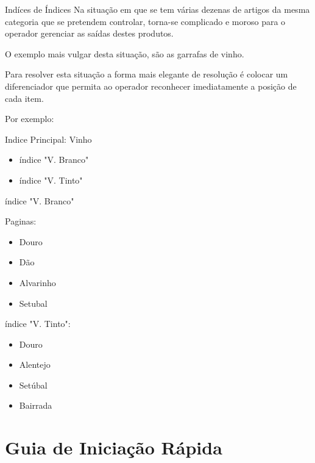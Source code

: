 \documentclass[a4paper,11pt,openany]{memoir}
\begin{document}
\begin{bclogo}[couleur=blue!10,arrondi=0.1,logo=\bccrayon,ombre=true]{Indíces de Índices}
Na situação em que se tem várias dezenas de artigos da mesma categoria que se pretendem controlar,
torna-se complicado e moroso para o operador gerenciar as saídas destes produtos.

O exemplo mais vulgar desta situação, são as garrafas de vinho. 

Para resolver esta situação a forma mais elegante de resolução é colocar um diferenciador que permita 
ao operador reconhecer imediatamente a posição de cada item.

Por exemplo:

Indice Principal: Vinho
\begin{itemize}
\item índice "V. Branco" 
\item índice "V. Tinto"
\end{itemize}

índice "V. Branco"

Paginas:

\begin{itemize}
\item Douro 
\item Dão
\item Alvarinho
\item Setubal     
\end{itemize}

índice "V. Tinto":

\begin{itemize}
\item Douro 
\item Alentejo
\item Setúbal
\item Bairrada
\end{itemize}
\end{bclogo}








\chapter{Guia de Iniciação Rápida}  %
\end{document}
